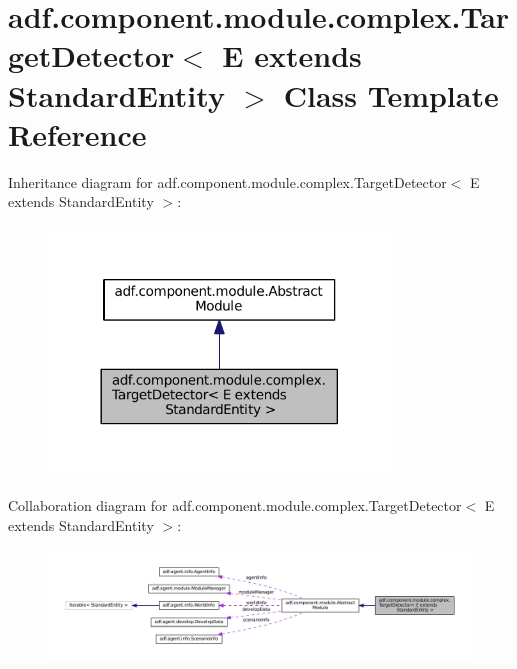 \hypertarget{classadf_1_1component_1_1module_1_1complex_1_1TargetDetector}{}\section{adf.\+component.\+module.\+complex.\+Target\+Detector$<$ E extends Standard\+Entity $>$ Class Template Reference}
\label{classadf_1_1component_1_1module_1_1complex_1_1TargetDetector}


Inheritance diagram for adf.\+component.\+module.\+complex.\+Target\+Detector$<$ E extends Standard\+Entity $>$\+:
\nopagebreak
\begin{figure}[H]
\begin{center}
\leavevmode
\includegraphics[width=257pt]{classadf_1_1component_1_1module_1_1complex_1_1TargetDetector__inherit__graph}
\end{center}
\end{figure}


Collaboration diagram for adf.\+component.\+module.\+complex.\+Target\+Detector$<$ E extends Standard\+Entity $>$\+:
\nopagebreak
\begin{figure}[H]
\begin{center}
\leavevmode
\includegraphics[width=350pt]{classadf_1_1component_1_1module_1_1complex_1_1TargetDetector__coll__graph}
\end{center}
\end{figure}
